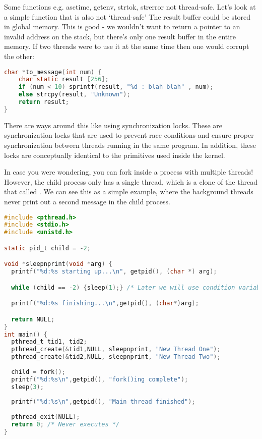 Some functions e.g. asctime, getenv, strtok, strerror not thread-safe. Let's look at a simple function that is also not `thread-safe' The result buffer could be stored in global memory. This is good - we wouldn't want to return a pointer to an invalid address on the stack, but there's only one result buffer in the entire memory. If two threads were to use it at the same time then one would corrupt the other:

\begin{lstlisting}[language=C]
char *to_message(int num) {
    char static result [256];
    if (num < 10) sprintf(result, "%d : blah blah" , num);
    else strcpy(result, "Unknown");
    return result;
}
\end{lstlisting}

There are ways around this like using synchronization locks. These are synchronization locks that are used to prevent race conditions and ensure proper synchronization between threads running in the same program. In addition, these locks are conceptually identical to the primitives used inside the kernel.

In case you were wondering, you can fork inside a process with multiple threads! However, the child process only has a single thread, which is a clone of the thread that called . We can see this as a simple example, where the background threads never print out a second message in the child process.

\begin{lstlisting}[language=C]
#include <pthread.h>
#include <stdio.h>
#include <unistd.h>

static pid_t child = -2;

void *sleepnprint(void *arg) {
  printf("%d:%s starting up...\n", getpid(), (char *) arg);

  while (child == -2) {sleep(1);} /* Later we will use condition variables */

  printf("%d:%s finishing...\n",getpid(), (char*)arg);

  return NULL;  
}
int main() {
  pthread_t tid1, tid2;
  pthread_create(&tid1,NULL, sleepnprint, "New Thread One");
  pthread_create(&tid2,NULL, sleepnprint, "New Thread Two");
  
  child = fork();
  printf("%d:%s\n",getpid(), "fork()ing complete");
  sleep(3);
    
  printf("%d:%s\n",getpid(), "Main thread finished");
  
  pthread_exit(NULL);
  return 0; /* Never executes */
}
\end{lstlisting}

